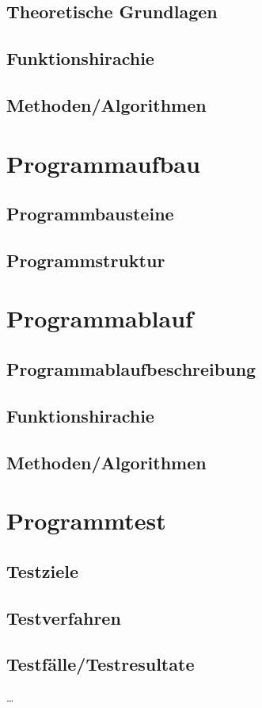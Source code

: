\documentclass[11pt]{article}
\begin{document}
  \subsection{Theoretische Grundlagen}
  \subsection{Funktionshirachie}
  \subsection{Methoden/Algorithmen}
  
  
  \section{Programmaufbau}
  \subsection{Programmbausteine}
  \subsection{Programmstruktur}
  
  
  \section{Programmablauf}
  \subsection{Programmablaufbeschreibung} 
  \subsection{Funktionshirachie}
  \subsection{Methoden/Algorithmen}
  
   \section{Programmtest}
  \subsection{Testziele}
  \subsection{Testverfahren}
  \subsection{Testfälle/Testresultate}
  \dots
   
 
\newpage
\end{document}
